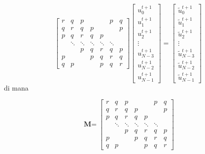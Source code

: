 \begin{equation}
	\label{matriks_implicit}
	{
		\begin{bmatrix}
			r 	& q			& p 	 & 		  & 	   & p 		& q \\
			q 	& r     	& q 	 & 	p	  & 	   &  		& p \\
			p 	& q     	& r 	 & 	q	  & p	   &  		&  	\\
			& \ddots 	& \ddots & \ddots & \ddots & \ddots &  	\\
			&  			& p 	 & 	q	  & r	   & q 		& p \\
			p 	&  			& 	 	 & 	p	  & q	   & r 		& q \\
			q 	& p 		&  		 & 		  & p	   & q 		& r
		\end{bmatrix}
	}
	{
		\begin{bmatrix}
			u^{t+1}_{0} 	\\
			u^{t+1}_{1} 	\\
			u^{t+1}_{2} 	\\
			\vdots 			\\
			u^{t+1}_{N-3}\\
			u^{t+1}_{N-2}\\
			u^{t+1}_{N-1}
		\end{bmatrix}
	}
	{
		=
	}
	{
		\begin{bmatrix}
			\tilde{u}^{t+1}_{0} 	\\
			\tilde{u}^{t+1}_{1} 	\\
			\tilde{u}^{t+1}_{2} 	\\
			\vdots 					\\
			\tilde{u}^{t+1}_{N-3}	\\
			\tilde{u}^{t+1}_{N-2}	\\
			\tilde{u}^{t+1}_{N-1}
		\end{bmatrix}
	}
\end{equation}
di mana

\begin{equation}
	\label{matriks_m}
	{
		\textbf{M} =
	}
	{
		\begin{bmatrix}
			r 	& q			& p 	 & 		  & 	   & p 		& q \\
			q 	& r     	& q 	 & 	p	  & 	   &  		& p \\
			p 	& q     	& r 	 & 	q	  & p	   &  		&  	\\
			& \ddots 	& \ddots & \ddots & \ddots & \ddots &  	\\
			&  			& p 	 & 	q	  & r	   & q 		& p \\
			p 	&  			& 	 	 & 	p	  & q	   & r 		& q \\
			q 	& p 		&  		 & 		  & p	   & q 		& r
		\end{bmatrix}
	}
\end{equation}

